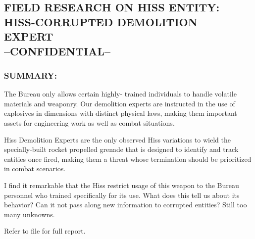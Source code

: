 \subsection*{FIELD RESEARCH ON HISS ENTITY:\\
	HISS-CORRUPTED DEMOLITION\\
	EXPERT\\
	--CONFIDENTIAL--}
\subsubsection*{SUMMARY:}
\par The Bureau only allows certain highly-
trained individuals to handle volatile
materials and weaponry. Our demolition
experts are instructed in the use of
explosives in dimensions with distinct
physical laws, making them important assets for engineering work
as well as combat situations.
\par Hiss Demolition Experts are the only observed Hiss variations to
wield the specially-built rocket propelled grenade that is designed
to identify and track 
entities once fired, making them a
threat whose termination should be prioritized in combat
scenarios.
\par I find it remarkable that the Hiss restrict usage of this weapon to
the Bureau personnel who trained specifically for its use. What
does this tell us about its behavior? Can it not pass along new
information to corrupted entities? Still too many unknowns.
\par Refer to file  for full report.